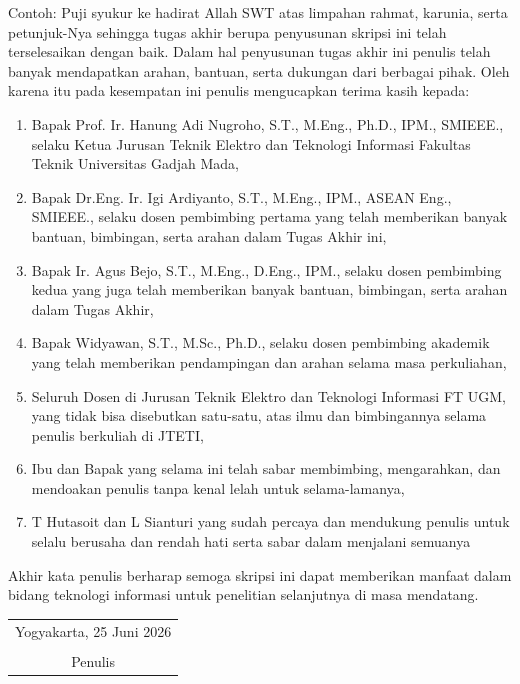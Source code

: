 Contoh: Puji syukur ke hadirat Allah SWT atas limpahan rahmat, karunia, serta petunjuk-Nya sehingga tugas akhir berupa penyusunan skripsi ini telah terselesaikan dengan baik. Dalam hal penyusunan tugas akhir ini penulis telah banyak mendapatkan arahan, bantuan, serta dukungan dari berbagai pihak. Oleh karena itu pada kesempatan ini penulis mengucapkan terima kasih kepada:


\begin{enumerate}
	\item{Bapak Prof. Ir. Hanung Adi Nugroho, S.T., M.Eng., Ph.D., IPM., SMIEEE., selaku Ketua Jurusan Teknik Elektro dan Teknologi Informasi Fakultas Teknik Universitas Gadjah Mada,}
	
	\item{Bapak Dr.Eng. Ir. Igi Ardiyanto, S.T., M.Eng., IPM., ASEAN Eng., SMIEEE., selaku dosen pembimbing pertama yang telah memberikan banyak bantuan, bimbingan, serta arahan dalam Tugas Akhir ini,}
	\item{Bapak Ir. Agus Bejo, S.T., M.Eng., D.Eng., IPM., selaku dosen pembimbing kedua yang juga telah memberikan banyak bantuan, bimbingan, serta arahan dalam Tugas Akhir,}
	\item{Bapak Widyawan, S.T., M.Sc., Ph.D., selaku dosen pembimbing akademik yang telah memberikan pendampingan dan arahan selama masa perkuliahan,}
	\item{Seluruh Dosen di Jurusan Teknik Elektro dan Teknologi Informasi FT UGM, yang tidak bisa disebutkan satu-satu, atas ilmu dan bimbingannya selama penulis berkuliah di JTETI,}
	\item{Ibu dan Bapak yang selama ini telah sabar membimbing, mengarahkan, dan mendoakan penulis tanpa kenal lelah untuk selama-lamanya,}
	\item{T Hutasoit dan L Sianturi yang sudah percaya dan mendukung penulis untuk selalu berusaha dan rendah hati serta sabar dalam menjalani semuanya}

\end{enumerate}

Akhir kata penulis berharap semoga skripsi ini dapat memberikan manfaat dalam bidang teknologi informasi untuk penelitian selanjutnya di masa mendatang.

\begin{flushright}
	\begin{tabular}{c}
		Yogyakarta, 25 Juni 2026 \\
		\vspace{1cm} \\
		Penulis
	\end{tabular}
\end{flushright}